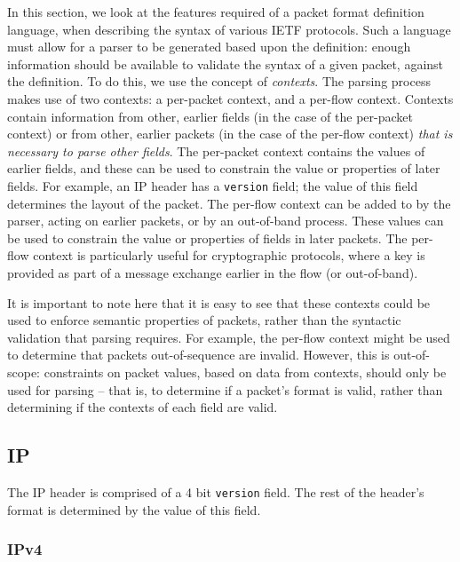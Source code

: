 \documentclass[10pt,a4paper]{article}
\begin{document}
In this section, we look at the features required of a packet format definition language,
when describing the syntax of various IETF protocols. Such a language must allow for a
parser to be generated based upon the definition: enough information should be available
to validate the syntax of a given packet, against the definition. To do this, we use the
concept of \emph{contexts}. The parsing process makes use of two contexts: a per-packet
context, and a per-flow context. Contexts contain information from other, earlier fields
(in the case of the per-packet context) or from other, earlier packets (in the case of the
per-flow context) \emph{that is necessary to parse other fields}. The per-packet context
contains the values of earlier fields, and these can be used to constrain the value or
properties of later fields. For example, an IP header has a \texttt{version} field; the
value of this field determines the layout of the packet. The per-flow context can be
added to by the parser, acting on earlier packets, or by an out-of-band process. These
values can be used to constrain the value or properties of fields in later packets. The
per-flow context is particularly useful for cryptographic protocols, where a key is
provided as part of a message exchange earlier in the flow (or out-of-band).

It is important to note here that it is easy to see that these contexts could be used to
enforce semantic properties of packets, rather than the syntactic validation that parsing
requires. For example, the per-flow context might be used to determine that packets
out-of-sequence are invalid. However, this is out-of-scope: constraints on packet values,
based on data from contexts, should only be used for parsing -- that is, to determine if
a packet's format is valid, rather than determining if the contexts of each field are
valid.

\subsection{IP}

The IP header is comprised of a 4 bit \texttt{version} field. The rest of the header's
format is determined by the value of this field.

\subsubsection*{IPv4}
\end{document}
